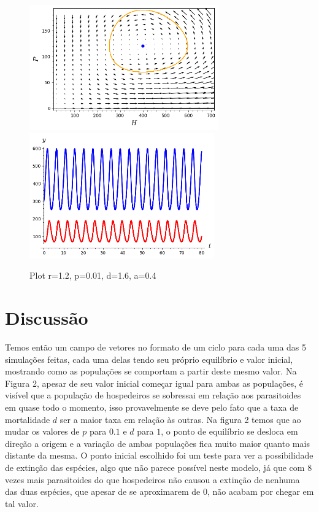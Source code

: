 \begin{figure}[h!]
\begin{center}
	\includegraphics[height=5.4cm]{Img/HP (r=1.2,p=0.01, d=1.6,a=0.4); (300, 80); (400, 120).png} \quad
	\includegraphics[height=5.4cm]{Img/T (r=1.2,p=0.01, d=1.6,a=0.4); (300, 80); (400, 120).png}
\caption{Plot r=1.2, p=0.01, d=1.6, a=0.4} \label{gdimotes}
\end{center}
\end{figure}

\newpage
        
\section{Discussão}
Temos então um campo de vetores no formato de um ciclo para cada uma das 5 simulações feitas, cada uma delas tendo seu próprio equilíbrio e valor inicial, mostrando como as populações se comportam a partir deste mesmo valor. Na Figura 2, apesar de seu valor inicial começar igual para ambas as populações, é visível que a população de hospedeiros se sobressai em relação aos parasitoides em quase todo o momento, isso provavelmente se deve pelo fato que a taxa de mortalidade $d$ ser a maior taxa em relação às outras. Na figura 2 temos que ao mudar os valores de $p$ para $0.1$ e $d$ para $1$, o ponto de equilíbrio se desloca em direção a origem e a variação de ambas populações fica muito maior quanto mais distante da mesma. O ponto inicial escolhido foi um teste para ver a possibilidade de extinção das espécies, algo que não parece possível neste modelo, já que com 8 vezes mais parasitoides do que hospedeiros não causou a extinção de nenhuma das duas espécies, que apesar de se aproximarem de 0, não acabam por chegar em tal valor.

